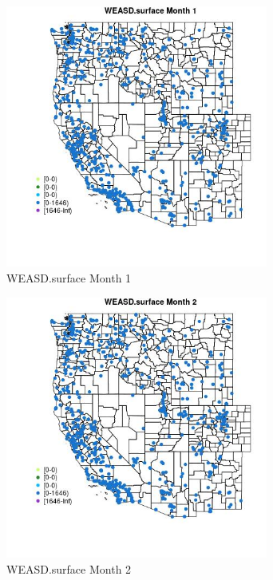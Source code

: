 \begin{figure} 
\centering  
\includegraphics[width=0.77\textwidth]{Code_Outputs/Report_ML_input_PM25_Step4_part_f_de_duplicated_aveswNAs_MapObsMo1WEASDsurface.jpg} 
\caption{\label{fig:Report_ML_input_PM25_Step4_part_f_de_duplicated_aveswNAsMapObsMo1WEASDsurface}WEASD.surface Month 1} 
\end{figure} 
 

\begin{figure} 
\centering  
\includegraphics[width=0.77\textwidth]{Code_Outputs/Report_ML_input_PM25_Step4_part_f_de_duplicated_aveswNAs_MapObsMo2WEASDsurface.jpg} 
\caption{\label{fig:Report_ML_input_PM25_Step4_part_f_de_duplicated_aveswNAsMapObsMo2WEASDsurface}WEASD.surface Month 2} 
\end{figure} 
 

